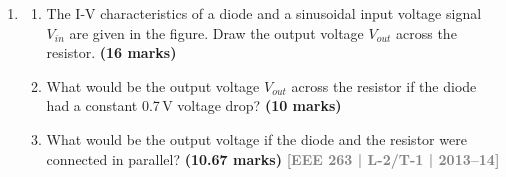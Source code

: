 \documentclass[12pt,a4paper]{article}
\newcommand{\yr}[1]{\hfill\textcolor{gray}{\small\textbf{[#1]}}}
\newcommand{\mk}[1]{\textcolor{orange!70!black}{\small\textbf{(#1 marks)}}}
\begin{document}
\begin{enumerate}
\begin{enumerate}
\begin{center}
\end{center}

\mk{20} \yr{EEE 263 | L-2/T-1 | 2012--13}




\item Draw the I-V characteristics curve of the above diode exactly to scale (mention the voltage(s) at which the diode begins conduction).
\mk{16} \yr{EEE 263 | L-2/T-1 | 2012--13}

\item Draw the voltage waveform across the diode if it had been connected in parallel to the resistance.
\mk{10} \yr{EEE 263 | L-2/T-1 | 2012--13}

\end{enumerate}


\item 
\begin{enumerate}


\item The I-V characteristics of a diode and a sinusoidal input voltage signal $V_{in}$ are given in the figure. Draw the output voltage $V_{out}$ across the resistor.
\mk{16} 
\item What would be the output voltage $V_{out}$ across the resistor if the diode had a constant 0.7\,V voltage drop?
\mk{10} 

\item What would be the output voltage if the diode and the resistor were connected in parallel?
\mk{10.67} \yr{EEE 263 | L-2/T-1 | 2013--14}

\begin{center}
\end{center}
\end{enumerate}
\end{enumerate}
\end{document}
